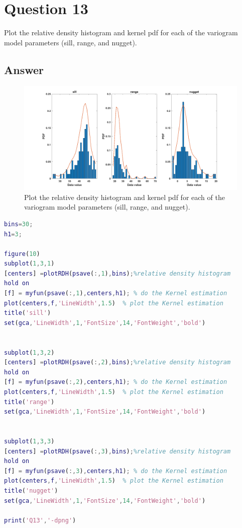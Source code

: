 \documentclass[
	12pt, %
]{fphw}
\begin{document}
 \section*{Question 13 }

\begin{problem}
Plot the relative density histogram and kernel pdf for each of the variogram model parameters (sill, range, and nugget).	
\end{problem}

\subsection*{Answer}

 \begin{figure}[htbp]
	\centering
	\includegraphics[width=1\columnwidth]{Q13.png} 
	\caption{Plot the relative density histogram and kernel pdf for each of the variogram model parameters (sill, range, and nugget). }
\end{figure}


\begin{lstlisting}[language=Matlab,escapeinside=``]
bins=30;
h1=3;

figure(10)
subplot(1,3,1)
[centers] =plotRDH(psave(:,1),bins);%relative density histogram
hold on
[f] = myfun(psave(:,1),centers,h1); % do the Kernel estimation 
plot(centers,f,'LineWidth',1.5)  % plot the Kernel estimation 
title('sill')
set(gca,'LineWidth',1,'FontSize',14,'FontWeight','bold')


subplot(1,3,2)
[centers] =plotRDH(psave(:,2),bins);%relative density histogram
hold on
[f] = myfun(psave(:,2),centers,h1); % do the Kernel estimation 
plot(centers,f,'LineWidth',1.5)  % plot the Kernel estimation 
title('range')
set(gca,'LineWidth',1,'FontSize',14,'FontWeight','bold')


subplot(1,3,3)
[centers] =plotRDH(psave(:,3),bins);%relative density histogram
hold on
[f] = myfun(psave(:,3),centers,h1); % do the Kernel estimation 
plot(centers,f,'LineWidth',1.5)  % plot the Kernel estimation 
title('nugget')
set(gca,'LineWidth',1,'FontSize',14,'FontWeight','bold')

print('Q13','-dpng')

\end{lstlisting}
\end{document}
